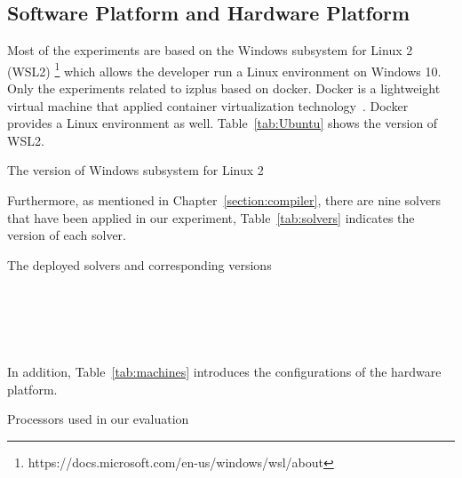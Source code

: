 \subsection{Software Platform and Hardware Platform}
\label{sec:softplat}
Most of the experiments are based on the Windows subsystem for Linux 2 (WSL2) \footnote{https://docs.microsoft.com/en-us/windows/wsl/about} which allows the developer run a Linux environment on Windows 10. Only the experiments related to izplus based on docker. Docker is a lightweight virtual machine that applied container virtualization technology~\cite{r25}. Docker provides a Linux environment as well. Table~\ref{tab:Ubuntu} shows the version of WSL2.
\begin{table}[htbp]
  \centering

  \caption{The version of Windows subsystem for Linux 2}
  
  \label{tab:Ubuntu}
  
\end{table}
Furthermore, as mentioned in Chapter~\ref{section:compiler}, there are nine solvers that have been applied in our experiment, Table~\ref{tab:solvers} indicates the version of each solver.
\begin{table}[htbp]
  \centering

  \caption{The deployed solvers and corresponding versions}
  
  \label{tab:solvers}
  	\begin{subtable}[b]{\textwidth}
  	\centering
  
    \end{subtable}\\
    	\begin{subtable}[b]{\textwidth}
  	\centering
  
  \end{subtable}\\
  \begin{subtable}[b]{\textwidth}
  \centering
  
  \end{subtable}
\end{table}
\\In addition, Table~\ref{tab:machines} introduces the configurations of the hardware platform.
\begin{table}[H]
  \centering

  \caption{Processors used in our evaluation}
  
  \label{tab:machines}
  
\end{table}
